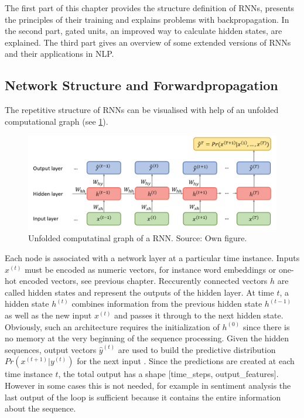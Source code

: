 \documentclass[]{krantz}
\begin{document}
The first part of this chapter provides the structure definition of RNNs, presents the principles of their training and explains problems with backpropagation. In the second part, gated units, an improved way to calculate hidden states, are explained. The third part gives an overview of some extended versions of RNNs and their applications in NLP.

\hypertarget{network-structure-and-forwardpropagation}{%
\subsection{Network Structure and Forwardpropagation}\label{network-structure-and-forwardpropagation}}

The repetitive structure of RNNs can be visualised with help of an unfolded computational graph (see \ref{fig:01-02-unfold}).

\begin{figure}

{\centering \includegraphics[width=1\linewidth]{figures/01-02-rnns-and-their-applications-in-nlp/02_unfolded_graph} 

}

\caption{Unfolded computatinal graph of a RNN. Source: Own figure.}\label{fig:01-02-unfold}
\end{figure}

Each node is associated with a network layer at a particular time instance. Inputs \(x^{(t)}\) must be encoded as numeric vectors, for instance word embeddings or one-hot encoded vectors, see previous chapter. Reccurently connected vectors \(h\) are called hidden states and represent the outputs of the hidden layer. At time \(t\), a hidden state \(h^{(t)}\) combines information from the previous hidden state \(h^{(t-1)}\) as well as the new input \(x^{(t)}\) and passes it through to the next hidden state. Obviously, such an architecture requires the initialization of \(h^{(0)}\) since there is no memory at the very beginning of the sequence processing. Given the hidden sequences, output vectors \(\hat{y}^{(t)}\) are used to build the predictive distribution \(Pr(x^{(t+1)}|y^{(t)})\) for the next input \citep{graves2013generating}. Since the predictions are created at each time instance \(t\), the total output has a shape {[}time\_steps, output\_features{]}. However in some cases this is not needed, for example in sentiment analysis the last output of the loop is sufficient because it contains the entire information about the sequence. \citep{chollet2018deep}
\end{document}
